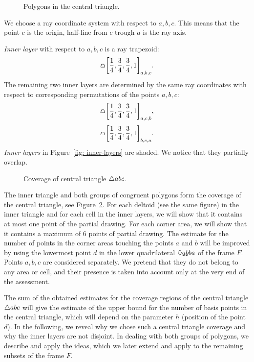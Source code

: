 \begin{figure}
\begin{center}

\end{center}
\caption{Polygons in the central triangle.}
\label{fig: subsets-of-triangle-abc}
\end{figure}

We choose a ray coordinate system with respect to $a, b, c$. This means that the point $c$ is the origin, half-line from $c$ trough $a$ is the ray axis.

\textit{Inner layer} with respect to $a,b,c$ is a ray trapezoid:
$$
\tpz{\left[ \frac{1}{4},\frac{3}{4},\frac{3}{4},1 \right]_{a,b,c} }.
$$
The remaining two inner layers are determined by the same ray coordinates with respect to corresponding permutations of the points $a,b,c$:
$$
\tpz{\left[ \frac{1}{4},\frac{3}{4},\frac{3}{4},1 \right]_{a,c,b} },
$$
$$
\tpz{\left[ \frac{1}{4},\frac{3}{4},\frac{3}{4},1 \right]_{b,c,a} }.
$$
\textit{Inner layers} in Figure~\ref{fig: inner-layers} are shaded. We notice that they partially overlap.

\begin{figure}
\begin{center}

\end{center}
\caption{Coverage of central triangle $\triangle{abc}$.}
\label{fig: united-cover-abc}
\end{figure}

The inner triangle and both groups of congruent polygons form the coverage of the central triangle, see Figure~\ref{fig: united-cover-abc}. For each deltoid (see the same figure) in the inner triangle and for each cell in the inner layers, we will show that it contains at most one point of the partial drawing. For each corner area, we will show that it contains a maximum of $6$ points of partial drawing. The estimate for the number of points in the corner areas touching the points $a$ and $b$ will be improved by using the lowermost point $d$ in the lower quadrilateral $\quadsym{\undersym{a}\undersym{b}ba}$ of the frame $F$. Points $a,b,c$ are considered separately. We pretend that they do not belong to any area or cell, and their presence is taken into account only at the very end of the assessment.

The sum of the obtained estimates for the coverage regions of the central triangle $\triangle{abc}$ will give the estimate of the upper bound for the number of basis points in the central triangle, which will depend on the parameter $h$ (position of the point $d$). In the following, we reveal why we chose such a central triangle coverage and why the inner layers are not disjoint. In dealing with both groups of polygons, we describe and apply the ideas, which we later extend and apply to the remaining subsets of the frame $F$.

